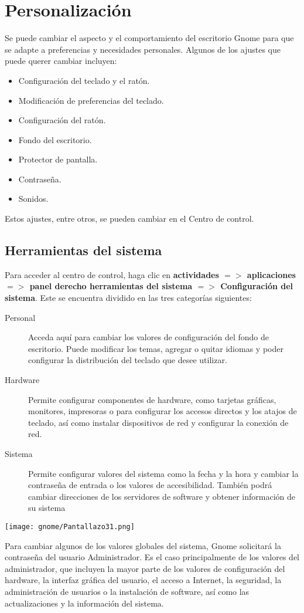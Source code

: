 \chapter{Personalización}
Se puede cambiar el aspecto y el comportamiento del escritorio Gnome para que se adapte a preferencias y necesidades personales. Algunos de los ajustes que puede querer cambiar incluyen:
\begin{itemize}
\item Configuración del teclado y el ratón.
\item Modificación de preferencias del teclado.
\item Configuración del ratón.
\item Fondo del escritorio.
\item Protector de pantalla.
\item Contraseña.
\item Sonidos.
\end{itemize}
Estos ajustes, entre otros, se pueden cambiar en el Centro de control.
\section{Herramientas del sistema}
Para acceder al centro de control, haga clic en {\bf actividades $=>$ aplicaciones $=>$ panel derecho herramientas del sistema $=>$ Configuración del sistema}. Este se encuentra dividido en las tres categorías siguientes:
\begin{description}
\item[Personal] Acceda aquí para cambiar los valores de configuración del fondo de escritorio. Puede modificar los temas, agregar o quitar idiomas y poder configurar la distribución del teclado que desee utilizar.
\item[Hardware] Permite configurar componentes de hardware, como tarjetas gráficas, monitores, impresoras o para configurar los accesos directos y los atajos de teclado, así como instalar dispositivos de red y configurar la conexión de red.
\item[Sistema] Permite configurar valores del sistema como la fecha y la hora y cambiar
la contraseña de entrada o los valores de accesibilidad.
También podrá cambiar direcciones de los servidores de software y obtener información de su sistema 
\end{description}
\begin{center}
\texttt{[image: gnome/Pantallazo31.png]}\\
\end{center}
Para cambiar algunos de los valores globales del sistema, Gnome solicitará
la contraseña del usuario Administrador. Es el caso principalmente de los
valores del administrador, que incluyen la mayor parte de los valores de configuración
del hardware, la interfaz gráfica del usuario, el acceso a Internet, la seguridad, la
administración de usuarios o la instalación de software, así como las actualizaciones y
la información del sistema.
